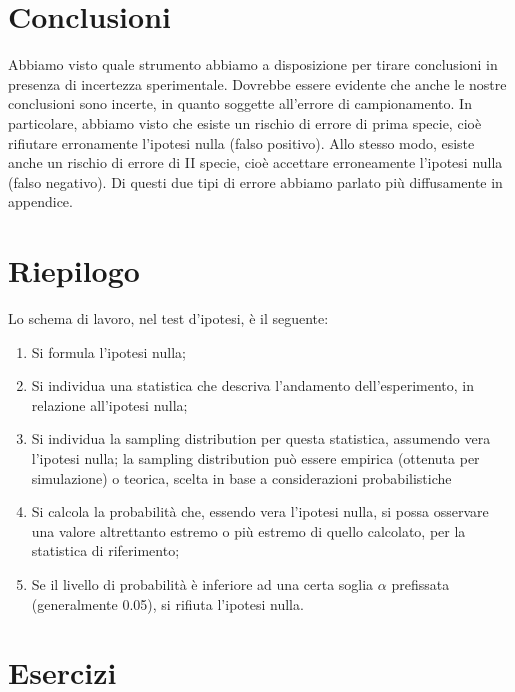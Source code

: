 \documentclass[a4paper,12pt,oneside]{book}
\providecommand{\tightlist}{%
  \setlength{\itemsep}{0pt}\setlength{\parskip}{0pt}}
\theoremstyle{definition}
\theoremstyle{definition}
\theoremstyle{definition}
\theoremstyle{remark}
\begin{document}
\section{Conclusioni}\label{conclusioni-1}

Abbiamo visto quale strumento abbiamo a disposizione per tirare
conclusioni in presenza di incertezza sperimentale. Dovrebbe essere
evidente che anche le nostre conclusioni sono incerte, in quanto
soggette all'errore di campionamento. In particolare, abbiamo visto che
esiste un rischio di errore di prima specie, cioè rifiutare erronamente
l'ipotesi nulla (falso positivo). Allo stesso modo, esiste anche un
rischio di errore di II specie, cioè accettare erroneamente l'ipotesi
nulla (falso negativo). Di questi due tipi di errore abbiamo parlato più
diffusamente in appendice.

\section{Riepilogo}\label{riepilogo}

Lo schema di lavoro, nel test d'ipotesi, è il seguente:

\begin{enumerate}
\def\labelenumi{\arabic{enumi}.}
\tightlist
\item
  Si formula l'ipotesi nulla;
\item
  Si individua una statistica che descriva l'andamento dell'esperimento,
  in relazione all'ipotesi nulla;
\item
  Si individua la sampling distribution per questa statistica, assumendo
  vera l'ipotesi nulla; la sampling distribution può essere empirica
  (ottenuta per simulazione) o teorica, scelta in base a considerazioni
  probabilistiche
\item
  Si calcola la probabilità che, essendo vera l'ipotesi nulla, si possa
  osservare una valore altrettanto estremo o più estremo di quello
  calcolato, per la statistica di riferimento;
\item
  Se il livello di probabilità è inferiore ad una certa soglia
  \(\alpha\) prefissata (generalmente 0.05), si rifiuta l'ipotesi nulla.
\end{enumerate}

\section{Esercizi}\label{esercizi-1}
\end{document}
